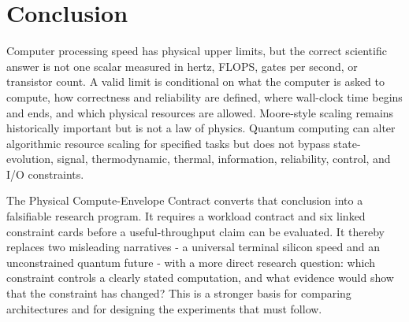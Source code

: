 \documentclass[conference]{IEEEtran}
\begin{document}
\section{Conclusion}

Computer processing speed has physical upper limits, but the correct
scientific answer is not one scalar measured in hertz, FLOPS, gates per
second, or transistor count. A valid limit is conditional on what the
computer is asked to compute, how correctness and reliability are defined,
where wall-clock time begins and ends, and which physical resources are
allowed. Moore-style scaling remains historically important but is not a law
of physics. Quantum computing can alter algorithmic resource scaling for
specified tasks but does not bypass state-evolution, signal, thermodynamic,
thermal, information, reliability, control, and I/O constraints.

The Physical Compute-Envelope Contract converts that conclusion into a
falsifiable research program. It requires a workload contract and six linked
constraint cards before a useful-throughput claim can be evaluated. It thereby
replaces two misleading narratives - a universal terminal silicon speed and
an unconstrained quantum future - with a more direct research question:
which constraint controls a clearly stated computation, and what evidence
would show that the constraint has changed? This is a stronger basis for
comparing architectures and for designing the experiments that must follow.
\end{document}
